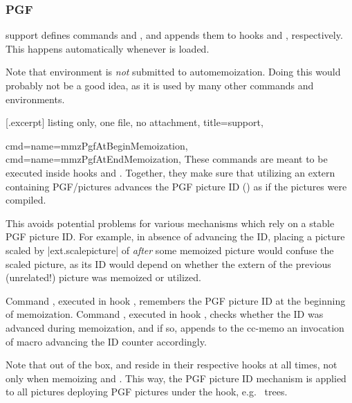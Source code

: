\documentclass[a4paper,11pt]{article}
\begin{document}
\subsubsection{PGF}
\label{sec:support:pgf}

\PGF support defines commands  and
, and appends them to hooks  and , respectively.  This happens
automatically whenever \PGF is loaded.

Note that environment  is \emph{not} submitted to
automemoization.  Doing this would probably not be a good idea, as it is used
by many other commands and environments.

[.excerpt]{%
  listing only, one file, no attachment,
  title=\PGF support,
}

\begin{doc}{
    cmd={name=mmzPgfAtBeginMemoization},
    cmd={name=mmzPgfAtEndMemoization},
  }
  These commands are meant to be executed inside hooks  and .  Together, they make sure
  that utilizing an extern containing PGF/\TikZ pictures advances the PGF
  picture ID () as if the pictures were compiled.
  
  This avoids potential problems for various mechanisms which rely on a stable
  PGF picture ID.  For example, in absence of advancing the ID, placing a \TikZ
  picture scaled by |ext.scalepicture| of  \emph{after} some
  memoized \TikZ picture would confuse the scaled picture, as its ID would
  depend on whether the extern of the previous (unrelated!)  picture was
  memoized or utilized.

  Command , executed in hook , remembers the PGF picture ID at the beginning of memoization.
  Command , executed in hook , checks whether the ID was advanced during memoization, and if
  so, appends to the cc-memo an invocation of macro
   advancing the ID counter accordingly.

  Note that out of the box,  and
   reside in their respective hooks at all
  times, not only when memoizing  and .  This
  way, the PGF picture ID mechanism is applied to all pictures deploying PGF
  pictures under the hook, e.g.\  trees.
\end{doc}
\end{document}
